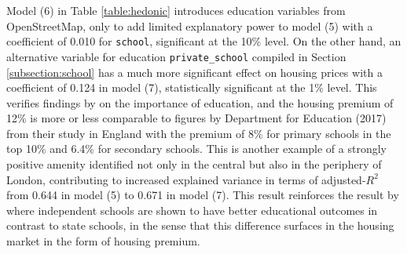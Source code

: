\documentclass{article}
\begin{document}
Model (6) in  Table \ref{table:hedonic} introduces education variables from OpenStreetMap, only to add limited explanatory power to model (5) with a coefficient of 0.010 for \texttt{school}, significant at the 10\% level. On the other hand, an alternative variable for education \texttt{private\_school} compiled in Section \ref{subsection:school} has a much more significant effect on housing prices with a coefficient of 0.124 in model (7), statistically significant at the 1\% level. This verifies findings by \citet{Niu2016ModelingDemand} on the importance of education, and the housing premium of 12\% is more or less comparable to figures by Department for Education (2017) from their study in England with the premium of 8\% for primary schools in the top 10\% and 6.4\% for secondary schools. This is another example of a strongly positive amenity identified not only in the central but also in the periphery of London, contributing to increased explained variance in terms of adjusted-$R^2$ from 0.644 in model (5) to 0.671 in model (7). This result reinforces the result by \citet{Ndaji2016ACouncil} where independent schools are shown to have better educational outcomes in contrast to state schools, in the sense that this difference surfaces in the housing market in the form of housing premium.\\\\
\end{document}
